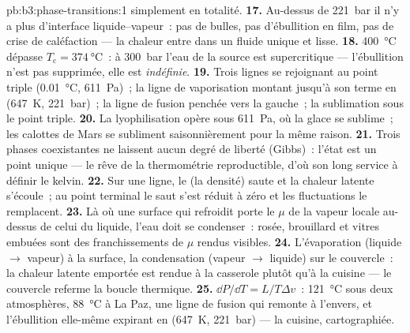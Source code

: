 \begin{solution}{pb:b3:phase-transitions:1}
simplement en totalité.
\textbf{17.} Au-dessus de \qty{221}{bar} il n'y a plus d'interface
liquide--vapeur~: pas de bulles, pas d'ébullition en film, pas de
crise de caléfaction --- la chaleur entre dans un fluide unique et
lisse.
\textbf{18.} \qty{400}{\celsius} dépasse $T_{\text{c}} =
\qty{374}{\celsius}$~: à \qty{300}{bar} l'eau de la source est
supercritique --- l'ébullition n'est pas supprimée, elle est
\emph{indéfinie}.
\textbf{19.} Trois lignes se rejoignant au point triple
(\qty{0.01}{\celsius}, \qty{611}{Pa})~; la ligne de vaporisation
montant jusqu'à son terme en (\qty{647}{K}, \qty{221}{bar})~; la
ligne de fusion penchée vers la gauche~; la sublimation sous le
point triple.
\textbf{20.} La lyophilisation opère sous \qty{611}{Pa}, où la
glace se sublime~; les calottes de Mars se subliment
saisonnièrement pour la même raison.
\textbf{21.} Trois phases coexistantes ne laissent aucun degré de
liberté (Gibbs)~: l'état est un point unique --- le rêve de la
thermométrie reproductible, d'où son long service à définir le
kelvin.
\textbf{22.} Sur une ligne, le  (la densité)
saute et la chaleur latente s'écoule~; au point terminal le saut
s'est réduit à zéro et les fluctuations le remplacent.
\textbf{23.} Là où une surface qui refroidit porte le $\mu$ de la
vapeur locale au-dessus de celui du liquide, l'eau doit se
condenser~: rosée, brouillard et vitres embuées sont des
franchissements de $\mu$ rendus visibles.
\textbf{24.} L'évaporation (liquide $\to$ vapeur) à la surface, la
condensation (vapeur $\to$ liquide) sur le couvercle~: la chaleur
latente emportée est rendue à la casserole plutôt qu'à la cuisine
--- le couvercle referme la boucle thermique.
\textbf{25.} $\dd P/\dd T = L/T\Delta v$~: \qty{121}{\celsius}
sous deux atmosphères, \qty{88}{\celsius} à La Paz, une ligne de
fusion qui remonte à l'envers, et l'ébullition elle-même expirant
en (\qty{647}{K}, \qty{221}{bar}) --- la cuisine, cartographiée.
\end{solution}
